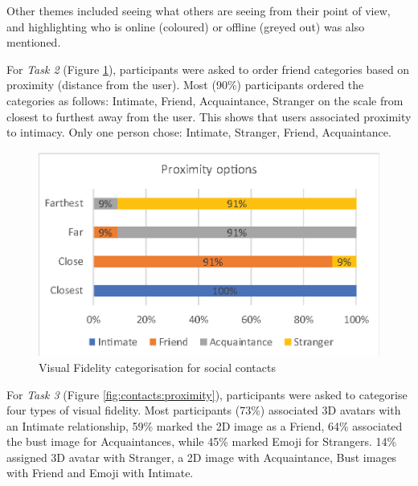 Other themes included seeing what others are seeing from their point of view, and highlighting who is online (coloured) or offline (greyed out) was also mentioned.



For \textit{Task 2} (Figure \ref{fig:contacts:visual-fidelity}), participants were asked to order friend categories based on proximity (distance from the user). Most (90\%) participants ordered the categories as follows: Intimate, Friend, Acquaintance, Stranger on the scale from closest to furthest away from the user. This shows that users associated proximity to intimacy. Only one person chose: Intimate, Stranger, Friend, Acquaintance. 

\begin{figure}[ht]
    \centering
    \includegraphics[width=0.8\linewidth]{images/41-visualising-mgia17/analysis-images-06.eps}
    \caption{Visual Fidelity categorisation for social contacts}
    \label{fig:contacts:visual-fidelity}
\end{figure}

For \textit{Task 3} (Figure \ref{fig:contacts:proximity}), participants were asked to categorise four types of visual fidelity. Most participants (73\%) associated 3D avatars with an Intimate relationship, 59\% marked the 2D image as a  Friend, 64\% associated the bust image for Acquaintances, while 45\% marked Emoji for Strangers. 14\% assigned 3D avatar with Stranger, a 2D image with Acquaintance, Bust images with Friend and Emoji with Intimate. 

